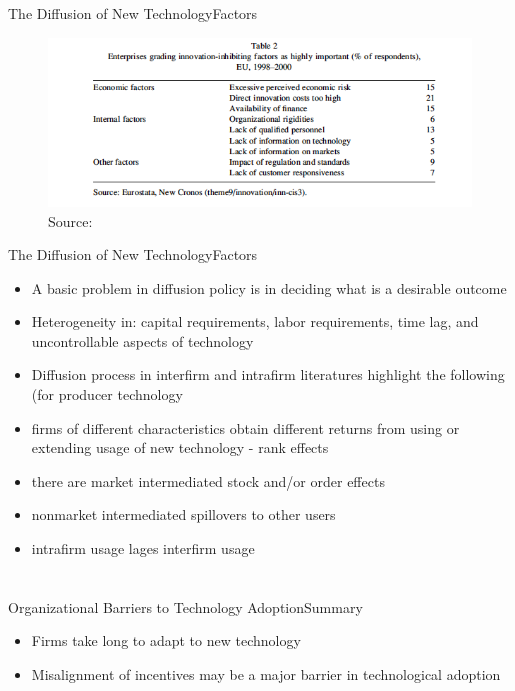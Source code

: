 \documentclass{beamer}
\begin{document}
\begin{frame}{The Diffusion of New Technology}{Factors}
\begin{figure}[h]
\begin{centering}
  \includegraphics[width=\textwidth]{stoneman2}
  \caption{Source: \cite{Stoneman2010}}
   \label{fig:stoneman2}
\end{centering}
\end{figure}
\end{frame}

\begin{frame}{The Diffusion of New Technology}{Factors}
\begin{itemize}
\item{A basic problem in diffusion policy is in deciding what is a desirable outcome}
\item{Heterogeneity in: capital requirements, labor requirements, time lag, and uncontrollable aspects of technology}
\item{Diffusion process in interfirm and intrafirm literatures highlight the following (for producer technology}
\item{firms of different characteristics obtain different returns from using or extending usage of new technology - rank effects}
\item{there are market intermediated stock and/or order effects}
\item{nonmarket intermediated spillovers to other users}
\item{intrafirm usage lages interfirm usage}
\end{itemize}
\end{frame}



\section{\cite{Atkin2015}}
\begin{frame}{Organizational Barriers to Technology Adoption}{Summary}
\begin{itemize}
\item{Firms take long to adapt to new technology}
\item{Misalignment of incentives may be a major barrier in technological adoption}
\end{itemize}
\end{frame}
\end{document}
